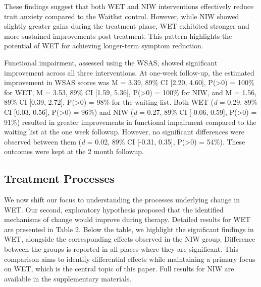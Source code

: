 \documentclass[
  man,floatsintext]{apa7}
\begin{document}
These findings suggest that both WET and NIW interventions effectively reduce trait anxiety compared to the Waitlist control.
However, while NIW showed slightly greater gains during the treatment phase, WET exhibited stronger and more sustained improvements post-treatment.
This pattern highlights the potential of WET for achieving longer-term symptom reduction.

Functional impairment, assessed using the WSAS, showed significant improvement across all three interventions.
At one-week follow-up, the estimated improvement in WSAS scores was M = 3.39, 89\% CI {[}2.20, 4.60{]}, P(\textgreater0) = 100\% for WET, M = 3.53, 89\% CI {[}1.59, 5.36{]}, P(\textgreater0) = 100\% for NIW, and M = 1.56, 89\% CI {[}0.39, 2.72{]}, P(\textgreater0) = 98\% for the waiting list.
Both WET (\emph{d} = 0.29, 89\% CI {[}0.03, 0.56{]}, P(\textgreater0) = 96\%) and NIW (\emph{d} = 0.27, 89\% CI {[}-0.06, 0.59{]}, P(\textgreater0) = 91\%) resulted in greater improvements in functional impairment compared to the waiting list at the one week followup.
However, no significant differences were observed between them (\emph{d} = 0.02, 89\% CI {[}-0.31, 0.35{]}, P(\textgreater0) = 54\%).
These outcomes were kept at the 2 month followup.

\subsection{Treatment Processes}\label{treatment-processes}

We now shift our focus to understanding the processes underlying change in WET.
Our second, exploratory hypothesis proposed that the identified mechanisms of change would improve during therapy.
Detailed results for WET are presented in Table 2.
Below the table, we highlight the significant findings in WET, alongside the corresponding effects observed in the NIW group.
Difference between the groups is reported in all places where they are significant.
This comparison aims to identify differential effects while maintaining a primary focus on WET, which is the central topic of this paper.
Full results for NIW are available in the supplementary materials.
\end{document}
